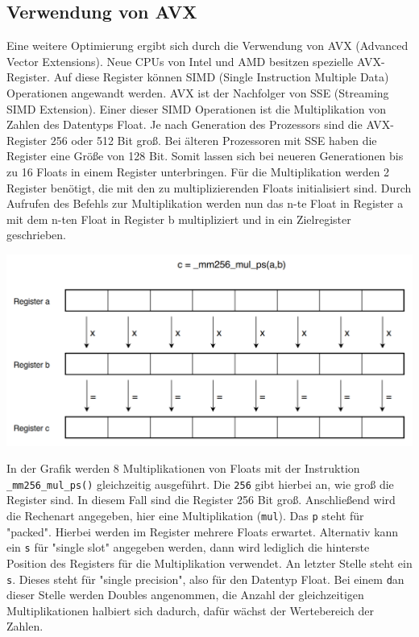 \documentclass[../main.tex]{subfiles}
\begin{document}
\subsection{Verwendung von AVX}

Eine weitere Optimierung ergibt sich durch die Verwendung von AVX (Advanced Vector Extensions).  Neue CPUs von Intel und AMD besitzen spezielle AVX-Register. Auf diese Register können SIMD (Single Instruction Multiple Data) Operationen angewandt werden. AVX ist der Nachfolger von SSE (Streaming SIMD Extension). Einer dieser SIMD Operationen ist die Multiplikation von Zahlen des Datentyps Float.
Je nach Generation des Prozessors sind die AVX-Register 256 oder 512 Bit groß. Bei älteren Prozessoren mit SSE haben die Register eine Größe von 128 Bit. Somit lassen sich bei neueren Generationen bis zu 16 Floats in einem Register unterbringen. Für die Multiplikation werden 2 Register benötigt, die mit den zu multiplizierenden Floats initialisiert sind. Durch Aufrufen des Befehls zur Multiplikation werden nun das n-te Float in Register a mit dem n-ten Float in Register b multipliziert und in ein Zielregister geschrieben.

\includegraphics[width=\textwidth]{../images/Benz/avx.png}

In der Grafik werden 8 Multiplikationen von Floats mit der Instruktion \texttt{\_mm256\_mul\_ps()} gleichzeitig ausgeführt. Die \texttt{256} gibt hierbei an, wie groß die Register sind. In diesem Fall sind die Register 256 Bit groß. Anschließend wird die Rechenart angegeben, hier eine Multiplikation (\texttt{mul}). Das \texttt{p} steht für "packed". Hierbei werden im Register mehrere Floats erwartet. Alternativ kann ein \texttt{s} für "single slot" angegeben werden, dann wird lediglich die hinterste Position des Registers für die Multiplikation verwendet. An letzter Stelle steht ein \texttt{s}. Dieses steht für "single precision", also für den Datentyp Float. Bei einem \texttt{d}an dieser Stelle werden Doubles angenommen, die Anzahl der gleichzeitigen Multiplikationen halbiert sich dadurch, dafür wächst der Wertebereich der Zahlen.
\end{document}
